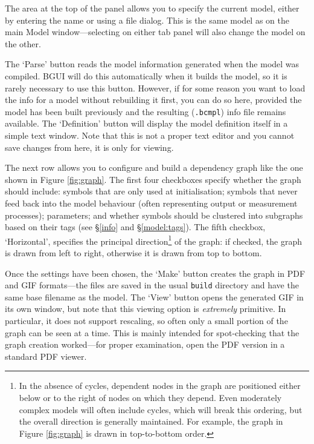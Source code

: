 \documentclass[a4paper,11pt]{article}
\begin{document}
The area at the top of the panel allows you to specify the current model, either by entering the name or using a file dialog. This is the same model as on the main Model window---selecting on either tab panel will also change the model on the other.

The `Parse' button reads the model information generated when the model was compiled. BGUI will do this automatically when it builds the model, so it is rarely necessary to use this button. However, if for some reason you want to load the info for a model without rebuilding it first, you can do so here, provided the model has been built previously and the resulting (\texttt{.bcmpl}) info file remains available. The `Definition' button will display the model definition itself in a simple text window. Note that this is not a proper text editor and you cannot save changes from here, it is only for viewing.

The next row allows you to configure and build a dependency graph like the one shown in Figure \ref{fig:graph}. The first four checkboxes specify whether the graph should include: symbols that are only used at initialisation; symbols that never feed back into the model behaviour (often representing output or measurement processes); parameters; and whether symbols should be clustered into subgraphs based on their tags (see \S\ref{info} and \S\ref{model:tags}). The fifth checkbox, `Horizontal', specifies the principal direction\footnote{In the absence of cycles, dependent nodes in the graph are positioned either below or to the right of nodes on which they depend. Even moderately complex models will often include cycles, which will break this ordering, but the overall direction is generally maintained. For example, the graph in Figure \ref{fig:graph} is drawn in top-to-bottom order.} of the graph: if checked, the graph is drawn from left to right, otherwise it is drawn from top to bottom.

Once the settings have been chosen, the `Make' button creates the graph in PDF and GIF formats---the files are saved in the usual \texttt{build} directory and have the same base filename as the model. The `View' button opens the generated GIF in its own window, but note that this viewing option is \textit{extremely} primitive. In particular, it does not support rescaling, so often only a small portion of the graph can be seen at a time. This is mainly intended for spot-checking that the graph creation worked---for proper examination, open the PDF version in a standard PDF viewer.
\end{document}
